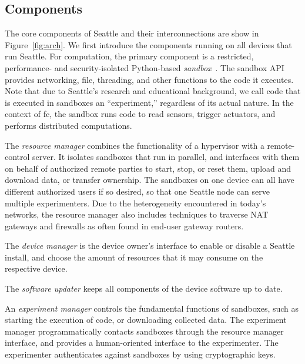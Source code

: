 \subsection{Components}\label{sec-components}

The core components of Seattle and their interconnections are
show in Figure~\ref{fig:arch}.
We first introduce the components running on all devices that
run Seattle.
For computation, the primary component is a restricted,
performance- and security-isolated Python-based
\textit{sandbox}~\cite{RepySandbox,li2015fence}.
The sandbox \gls{API} provides
networking, file, threading, and other functions to
the code it executes. Note that
due to Seattle's research and educational background, we
call code that is executed in sandboxes an ``experiment,''
regardless of its actual nature.
In the context of \gls{fc}, the sandbox runs code to read
sensors, trigger actuators, and performs distributed computations.

The \textit{resource manager} combines the functionality of
a hypervisor with a remote-control server.
It isolates %
sandboxes that run in
parallel, and interfaces with them on behalf of authorized remote
parties to start, stop, or reset them, upload and download data,
or transfer ownership. The sandboxes on one
device can all have different authorized users if so desired,
so that one Seattle node can serve multiple experimenters.
Due to the heterogeneity encountered in today's networks,
the resource manager also includes techniques to traverse
\gls{NAT} gateways and firewalls as often found in end-user
gateway routers.

The \textit{device manager} %
is the device owner's interface to enable or disable a Seattle
install, and choose the amount of resources that it may consume on the respective
device.

The \textit{software updater} keeps all components of the
device software up to date.

An \textit{experiment manager} controls the fundamental functions of sandboxes, such as
starting the execution of code, or downloading collected data.
The experiment manager programmatically contacts sandboxes
through the resource manager interface, and provides a
human-oriented interface to the experimenter. The experimenter
authenticates against sandboxes by using cryptographic keys.

